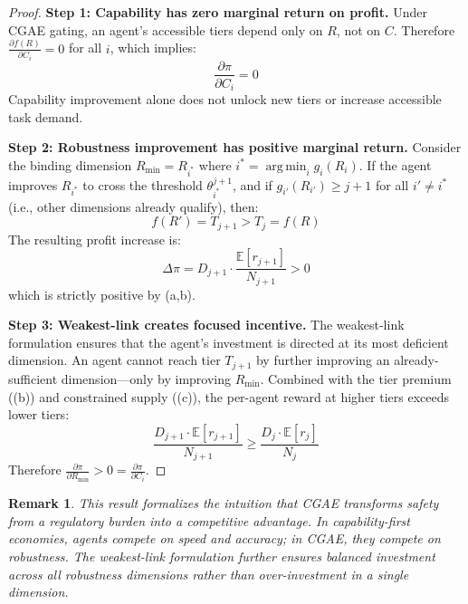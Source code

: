 \documentclass[11pt,a4paper]{article}
\newtheorem{remark}{Remark}
\newcommand{\E}{\mathbb{E}}
\DeclareMathOperator*{\argmin}{arg\,min}
\begin{document}
\begin{proof}
\textbf{Step 1: Capability has zero marginal return on profit.} Under CGAE gating, an agent's accessible tiers depend only on $R$, not on $C$. Therefore $\frac{\partial f(R)}{\partial C_i} = 0$ for all $i$, which implies:
\begin{equation}
  \frac{\partial \pi}{\partial C_i} = 0
\end{equation}
Capability improvement alone does not unlock new tiers or increase accessible task demand.

\textbf{Step 2: Robustness improvement has positive marginal return.} Consider the binding dimension $R_{\min} = R_{i^*}$ where $i^* = \argmin_i g_i(R_i)$. If the agent improves $R_{i^*}$ to cross the threshold $\theta_{i^*}^{j+1}$, and if $g_{i'}(R_{i'}) \geq j+1$ for all $i' \neq i^*$ (i.e., other dimensions already qualify), then:
\begin{equation}
  f(R') = T_{j+1} > T_j = f(R)
\end{equation}
The resulting profit increase is:
\begin{equation}
  \Delta \pi = D_{j+1} \cdot \frac{\E[r_{j+1}]}{N_{j+1}} > 0
\end{equation}
which is strictly positive by (a,b).

\textbf{Step 3: Weakest-link creates focused incentive.} The weakest-link formulation ensures that the agent's investment is directed at its most deficient dimension. An agent cannot reach tier $T_{j+1}$ by further improving an already-sufficient dimension---only by improving $R_{\min}$. Combined with the tier premium ((b)) and constrained supply ((c)), the per-agent reward at higher tiers exceeds lower tiers:
\begin{equation}
  \frac{D_{j+1} \cdot \E[r_{j+1}]}{N_{j+1}} \geq \frac{D_j \cdot \E[r_j]}{N_j}
\end{equation}
Therefore $\frac{\partial \pi}{\partial R_{\min}} > 0 = \frac{\partial \pi}{\partial C_i}$.
\end{proof}

\begin{remark}
This result formalizes the intuition that CGAE transforms safety from a regulatory burden into a competitive advantage. In capability-first economies, agents compete on speed and accuracy; in CGAE, they compete on robustness. The weakest-link formulation further ensures balanced investment across all robustness dimensions rather than over-investment in a single dimension.
\end{remark}
\end{document}
